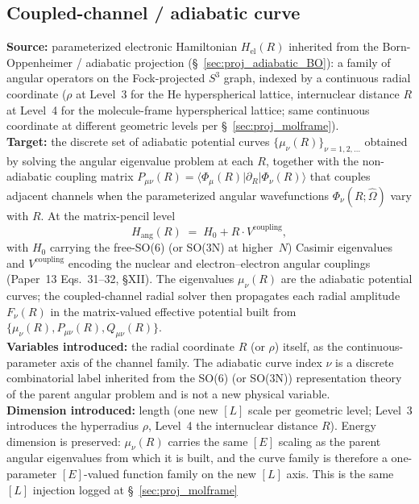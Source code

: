 \documentclass[11pt]{article}
\begin{document}
\subsection{Coupled-channel / adiabatic curve}
\label{sec:proj_coupled_channel}
\textbf{Source:} parameterized electronic Hamiltonian $H_\text{el}(R)$
inherited from the Born-Oppenheimer / adiabatic projection
(\S~\ref{sec:proj_adiabatic_BO}): a family of angular operators on
the Fock-projected $S^3$ graph, indexed by a continuous radial
coordinate ($\rho$ at Level~3 for the He hyperspherical lattice,
internuclear distance $R$ at Level~4 for the molecule-frame
hyperspherical lattice; same continuous coordinate at different
geometric levels per \S~\ref{sec:proj_molframe}).\\
\textbf{Target:} the discrete set of adiabatic potential curves
$\{\mu_\nu(R)\}_{\nu = 1, 2, \ldots}$ obtained by solving the angular
eigenvalue problem at each $R$, together with the non-adiabatic
coupling matrix $P_{\mu\nu}(R) = \langle \Phi_\mu(R) | \partial_R |
\Phi_\nu(R) \rangle$ that couples adjacent channels when the
parameterized angular wavefunctions $\Phi_\nu(R; \hat{\Omega})$ vary
with $R$.  At the matrix-pencil level
\[
  H_\text{ang}(R) \;=\; H_0 + R \cdot V^\text{coupling},
\]
with $H_0$ carrying the free-SO(6) (or SO(3N) at higher~$N$) Casimir
eigenvalues and $V^\text{coupling}$ encoding the nuclear and
electron--electron angular couplings (Paper~13 Eqs.~31--32, §XII).
The eigenvalues $\mu_\nu(R)$ are the adiabatic potential curves; the
coupled-channel radial solver then propagates each radial amplitude
$F_\nu(R)$ in the matrix-valued effective potential built from
$\{\mu_\nu(R), P_{\mu\nu}(R), Q_{\mu\nu}(R)\}$.\\
\textbf{Variables introduced:} the radial coordinate $R$ (or $\rho$)
itself, as the continuous-parameter axis of the channel family.  The
adiabatic curve index $\nu$ is a discrete combinatorial label inherited
from the SO(6) (or SO(3N)) representation theory of the parent angular
problem and is not a new physical variable.\\
\textbf{Dimension introduced:} length (one new $[L]$ scale per
geometric level; Level~3 introduces the hyperradius $\rho$, Level~4
the internuclear distance $R$).  Energy dimension is preserved:
$\mu_\nu(R)$ carries the same $[E]$ scaling as the parent angular
eigenvalues from which it is built, and the curve family is therefore
a one-parameter $[E]$-valued function family on the new $[L]$ axis.
This is the same $[L]$ injection logged at \S~\ref{sec:proj_molframe}
\end{document}
